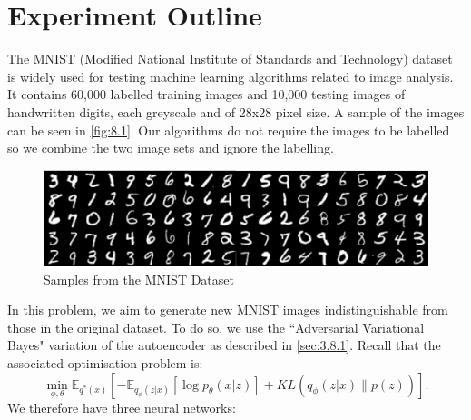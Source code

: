 \documentclass[honours,12pt]{unswthesis}
\newcommand{\E}{\mathbb{E}}
\numberwithin{equation}{section}
\theoremstyle{definition}
\begin{document}
\section{Experiment Outline}
The MNIST (Modified National Institute of Standards and Technology) dataset is widely used for testing machine learning algorithms related to image analysis. It contains 60,000 labelled training images and 10,000 testing images of handwritten digits, each greyscale and of 28x28 pixel size. A sample of the images can be seen in \autoref{fig:8.1}. Our algorithms do not require the images to be labelled so we combine the two image sets and ignore the labelling.
\begin{figure}[b]
\includegraphics[width=\linewidth]{mnist-digits-small.png}
\caption{Samples from the MNIST Dataset}
\label{fig:8.1}
\end{figure}
In this problem, we aim to generate new MNIST images indistinguishable from those in the original dataset. To do so, we use the ``Adversarial Variational Bayes" variation of the autoencoder as described in \autoref{sec:3.8.1}. Recall that the associated optimisation problem is:
\[\min_{\phi,\theta}\E_{q^*(x)}\left[-\E_{q_\phi(z|x)}[\log p_\theta(x|z)]+KL(q_\phi(z|x)\|p(z))\right].\]
We therefore have three neural networks:
\end{document}
